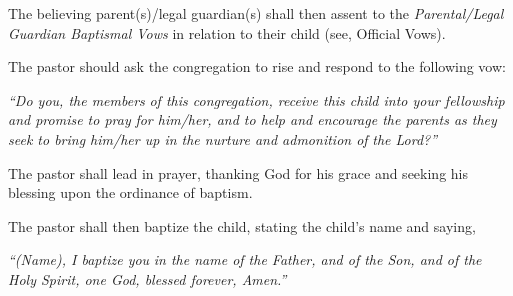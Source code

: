 \begin{outerlst}[left=0pt,labelsep=0pt]
\begin{innerlst}[resume*]
      \item The believing parent(s)/legal guardian(s) shall then assent to the \textit{Parental}\textit{/Legal Guardian Baptismal Vows} in relation to their child (see, Official Vows). 
      \item The pastor should ask the congregation to rise and respond to the following vow: 
\end{innerlst}
\textit{{``Do you, the members}}\textit{ of this congregation, receive this child into your fellowship}\textit{ and promise to pray}\textit{ for him/her, and to help and encourage the parent}\textit{s as they seek to bring him/her up in the nurture and admonition of}\textit{ the Lord?''}   

\begin{innerlst}[resume*]
      \item The pastor shall lead in prayer, thanking God for his grace and seeking his blessing upon the ordinance of baptism. 
      \item The pastor shall then baptize the child, stating the child's name and saying, 
\end{innerlst}
\textit{{``(Name), I baptize you}}\textit{ in the name of the Father, and of the Son}\textit{, and of the Holy Spirit}\textit{, one God, blessed forever, Amen.''}   


\end{outerlst}

